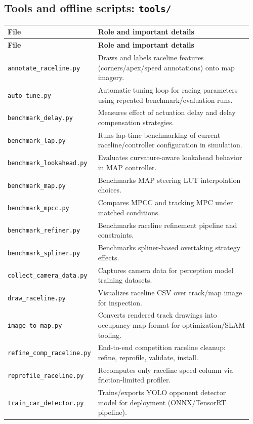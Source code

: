 \documentclass[11pt]{article}
\begin{document}
\subsection{Tools and offline scripts: \texttt{tools/}}
\begin{longtable}{p{0.30\linewidth}p{0.66\linewidth}}
\toprule
\textbf{File} & \textbf{Role and important details} \\
\midrule
\endfirsthead
\toprule
\textbf{File} & \textbf{Role and important details} \\
\midrule
\endhead
\texttt{annotate\_raceline.py} & Draws and labels raceline features (corners/apex/speed annotations) onto map imagery. \\
\texttt{auto\_tune.py} & Automatic tuning loop for racing parameters using repeated benchmark/evaluation runs. \\
\texttt{benchmark\_delay.py} & Measures effect of actuation delay and delay compensation strategies. \\
\texttt{benchmark\_lap.py} & Runs lap-time benchmarking of current raceline/controller configuration in simulation. \\
\texttt{benchmark\_lookahead.py} & Evaluates curvature-aware lookahead behavior in MAP controller. \\
\texttt{benchmark\_map.py} & Benchmarks MAP steering LUT interpolation choices. \\
\texttt{benchmark\_mpcc.py} & Compares MPCC and tracking MPC under matched conditions. \\
\texttt{benchmark\_refiner.py} & Benchmarks raceline refinement pipeline and constraints. \\
\texttt{benchmark\_spliner.py} & Benchmarks spliner-based overtaking strategy effects. \\
\texttt{collect\_camera\_data.py} & Captures camera data for perception model training datasets. \\
\texttt{draw\_raceline.py} & Visualizes raceline CSV over track/map image for inspection. \\
\texttt{image\_to\_map.py} & Converts rendered track drawings into occupancy-map format for optimization/SLAM tooling. \\
\texttt{refine\_comp\_raceline.py} & End-to-end competition raceline cleanup: refine, reprofile, validate, install. \\
\texttt{reprofile\_raceline.py} & Recomputes only raceline speed column via friction-limited profiler. \\
\texttt{train\_car\_detector.py} & Trains/exports YOLO opponent detector model for deployment (ONNX/TensorRT pipeline). \\
\bottomrule
\end{longtable}
\end{document}
